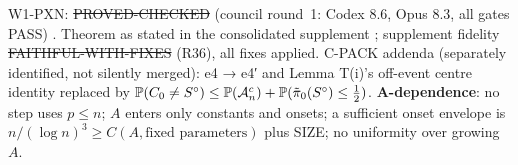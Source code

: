 \begin{statusbox}
W1-PXN: \st{PROVED-CHECKED} (council round~1: Codex 8.6, Opus 8.3, all gates PASS) . Theorem as stated in the consolidated supplement ; supplement fidelity \st{FAITHFUL-WITH-FIXES} (R36), all fixes applied. C-PACK addenda (separately identified, not silently merged): e4 → e4′ and Lemma T(i)'s off-event centre identity replaced by $\mathbb P(C_0\ne S^\circ)\le\mathbb P(\mathcal A_n^c)+\mathbb P(\tilde{\pi}_0(S^\circ)\le\frac12)$. \textbf{A-dependence}: no step uses $p\le n$; $A$ enters only constants and onsets; a sufficient onset envelope is $n/(\log n)^3\ge C(A,\text{fixed parameters})$ plus SIZE; no uniformity over growing $A$.
\end{statusbox}

